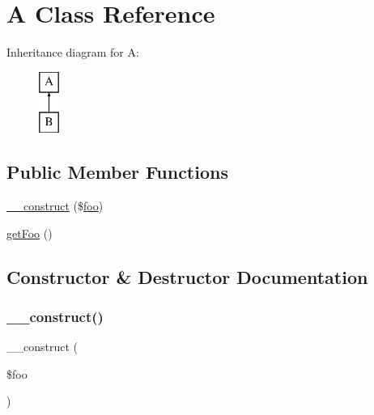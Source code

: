 \hypertarget{class_deep_copy_1_1f008_1_1_a}{}\section{A Class Reference}
\label{class_deep_copy_1_1f008_1_1_a}
Inheritance diagram for A\+:\begin{figure}[H]
\begin{center}
\leavevmode
\includegraphics[height=2.000000cm]{class_deep_copy_1_1f008_1_1_a}
\end{center}
\end{figure}
\subsection*{Public Member Functions}
\begin{DoxyCompactItemize}
\item 
\mbox{\hyperlink{class_deep_copy_1_1f008_1_1_a_aa02ef3aa4e95e4ce53658be17c06533d}{\+\_\+\+\_\+construct}} (\$\mbox{\hyperlink{interfacefoo}{foo}})
\item 
\mbox{\hyperlink{class_deep_copy_1_1f008_1_1_a_a4d92c456d98bc078936e71714ca1840f}{get\+Foo}} ()
\end{DoxyCompactItemize}


\subsection{Constructor \& Destructor Documentation}
\mbox{\label{class_deep_copy_1_1f008_1_1_a_aa02ef3aa4e95e4ce53658be17c06533d}} 
\subsubsection{\texorpdfstring{\+\_\+\+\_\+construct()}{\_\_construct()}}
{\footnotesize\ttfamily \+\_\+\+\_\+construct (\begin{DoxyParamCaption}\item[{}]{\$foo }\end{DoxyParamCaption})}



